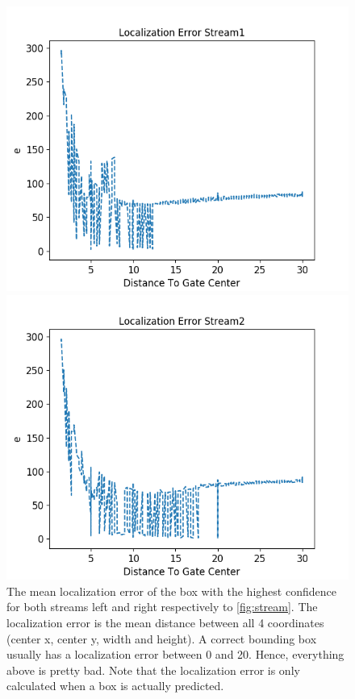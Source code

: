 \documentclass{article}
\begin{document}
\begin{figure}[ht]
	\centering
	\begin{minipage}{0.4\textwidth}
		\centering
		\includegraphics[width=\textwidth]{../fig/loc-error-stream1}
	\end{minipage}
	\begin{minipage}{0.4\textwidth}
		\centering
		\includegraphics[width=\textwidth]{../fig/loc-error-stream2}
	\end{minipage}
	\caption{The mean localization error of the box with the highest confidence for both streams left and right respectively to \autoref{fig:stream}. The localization error is the mean distance between all 4 coordinates (center x, center y, width and height). A correct bounding box usually has a localization error between 0 and 20. Hence, everything above is pretty bad. Note that the localization error is only calculated when a box is actually predicted.}
	\label{fig:locerror}
\end{figure}
\end{document}
